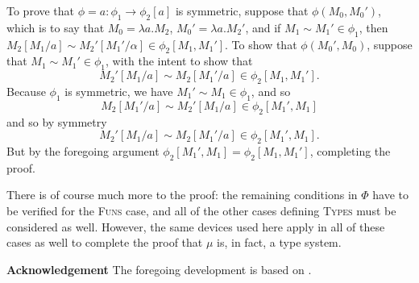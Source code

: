\documentclass[11pt,twoside]{article}
\begin{document}
\smallskip

To prove that $\phi=a:\phi_{1}\to\phi_{2}[a]$ is symmetric, suppose that
$\phi(M_{0},M_{0}')$, which is to say that $M_{0}=\lambda a.M_{2}$,
$M_{0}'=\lambda a.M_{2}'$, and if $M_{1}\sim M_{1}'\in\phi_{1}$, then
$M_{2}[M_{1}/a]\sim M_{2}'[Μ_{1}'/α]\in \phi_{2}[M_{1},M_{1}']$.  To show that
$\phi(M_{0}',M_{0})$, suppose that $M_{1}\sim M_{1}'\in\phi_{1}$, with the intent to show that
$$M_{2}'[M_{1}/a]\sim M_{2}[M_{1}'/a]\in\phi_{2}[M_{1},M_{1}'].$$
Because $\phi_{1}$ is symmetric, we have $M_{1}'\sim M_{1} \in\phi_{1}$, and so
$$M_{2}[M_{1}'/a]\sim M_{2}'[M_{1}/a]\in\phi_{2}[M_{1}',M_{1}]$$
and so by symmetry
$$M_{2}'[M_{1}/a]\sim M_{2}[M_{1}'/a]\in\phi_{2}[M_{1}',M_{1}].$$
But by the foregoing argument $\phi_{2}[M_{1}',M_{1}]=\phi_{2}[M_{1},M_{1}']$, completing the
proof.

\bigskip

There is of course much more to the proof: the remaining conditions in $\Phi$ have to be
verified for the \textsc{Funs} case, and all of the other cases defining \textsc{Types}
must be considered as well.  However, the same devices used here apply in all of these
cases as well to complete the proof that $\mu$ is, in fact, a type system.

\bigskip

\noindent
\textbf{Acknowledgement}
The foregoing development is based on \citet{angiuli19}.

\nocite{angiuli19}



\end{document}
